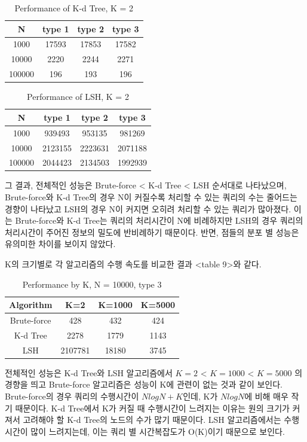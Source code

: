 \documentclass{sig-alternate-05-2015}
\begin{document}
\begin{CJK}{UTF8}{mj}
\begin{table}
\centering
\caption{Performance of K-d Tree, K = 2}
\begin{tabular}{|c|c|c|c|} \hline
N & type 1 & type 2 & type 3 \\ \hline
1000 & 17593 & 17853 & 17582 \\ \hline
10000 & 2220 & 2244 & 2271 \\ \hline
100000 & 196 & 193 & 196 \\ 
\hline\end{tabular}
\end{table}

\begin{table}
\centering
\caption{Performance of LSH, K = 2}
\begin{tabular}{|c|c|c|c|} \hline
N & type 1 & type 2 & type 3 \\ \hline
1000 & 939493 & 953135 & 981269 \\ \hline
10000 & 2123155 & 2223631 & 2071188 \\ \hline
100000 & 2044423 & 2134503 & 1992939 \\ 
\hline\end{tabular}
\end{table}

그 결과, 전체적인 성능은 Brute-force < K-d Tree < LSH 순서대로 나타났으며, Brute-force와 K-d Tree의 경우 N이 커질수록 처리할 수 있는 쿼리의 수는 줄어드는 경향이 나타났고 LSH의 경우 N이 커지면 오히려 처리할 수 있는 쿼리가 많아졌다. 이는 Brute-force와 K-d Tree는 쿼리의 처리시간이 N에 비례하지만 LSH의 경우 쿼리의 처리시간이 주어진 정보의 밀도에 반비례하기 때문이다. 반면, 점들의 분포 별 성능은 유의미한 차이를 보이지 않았다.

K의 크기별로 각 알고리즘의 수행 속도를 비교한 결과 <table 9>와 같다.

\begin{table}
\centering
\caption{Performance by K, N = 10000, type 3}
\begin{tabular}{|c|c|c|c|} \hline
Algorithm & K=2 & K=1000 & K=5000 \\ \hline
Brute-force & 428 & 432 & 424 \\ \hline
K-d Tree & 2278 & 1779 & 1143 \\ \hline
LSH & 2107781 & 18180 & 3745 \\ 
\hline\end{tabular}
\end{table}

전체적인 성능은 K-d Tree와 LSH 알고리즘에서 $K=2$ < $K=1000$ < $K=5000$ 의 경향을 띄고 Brute-force 알고리즘은 성능이 K에 관련이 없는 것과 같이 보인다. Brute-force의 경우 쿼리의 수행시간이 $N logN + K$인데, K가 $N log N$에 비해 매우 작기 때문이다. K-d Tree에서 K가 커질 때 수행시간이 느려지는 이유는 원의 크기가 커져서 고려해야 할 K-d Tree의 노드의 수가 많기 때문이다. LSH 알고리즘에서는 수행시간이 많이 느려지는데, 이는 쿼리 별 시간복잡도가 O(K)이기 때문으로 보인다.


\end{CJK}
\end{document}
